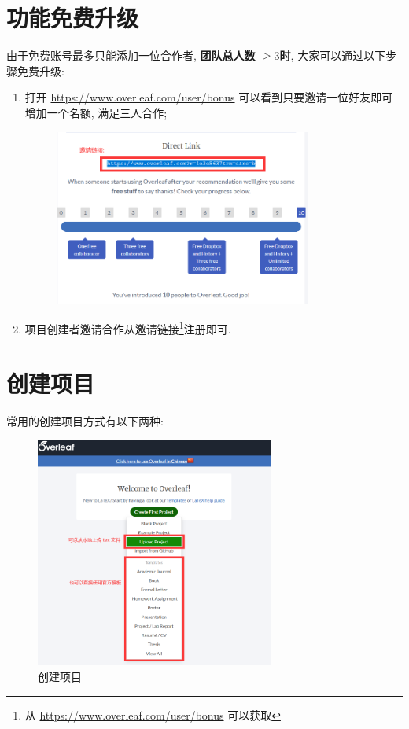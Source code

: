 \documentclass{booki}
\begin{document}
\section{功能免费升级}\label{header-n5}

由于免费账号最多只能添加一位合作者, \textbf{团队总人数 \( \geq3\)时},
大家可以通过以下步骤免费升级:

\begin{enumerate}
    \item 打开 \url{https://www.overleaf.com/user/bonus}
          可以看到只要邀请一位好友即可增加一个名额, 满足三人合作;
          \begin{figure}[H]
              \centering
              \includegraphics[width=0.8\textwidth]{Guidepics/20210415183943.png}
          \end{figure}
    \item 项目创建者邀请合作从邀请链接\footnote{从 \url{https://www.overleaf.com/user/bonus} 可以获取}注册即可.
\end{enumerate}

\section{创建项目}\label{header-n10}

常用的创建项目方式有以下两种:
\begin{figure}[H]
    \centering
    \includegraphics[width=0.7\textwidth]{Guidepics/20210415183951.png}
    \caption{创建项目}
\end{figure}
\end{document}
